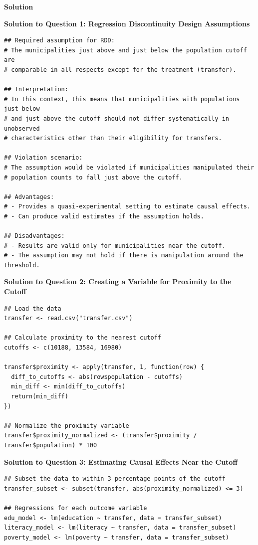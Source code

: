 \documentclass[12pt]{article}
\newif\ifsolutions
\begin{document}
\ifsolutions \color{blue}
{\color{blue}

\begin{center}
    \textbf{\large Solution}    
\end{center}

\textbf{Solution to Question 1: Regression Discontinuity Design Assumptions}
\begin{verbatim}
## Required assumption for RDD:
# The municipalities just above and just below the population cutoff are
# comparable in all respects except for the treatment (transfer).

## Interpretation:
# In this context, this means that municipalities with populations just below
# and just above the cutoff should not differ systematically in unobserved
# characteristics other than their eligibility for transfers.

## Violation scenario:
# The assumption would be violated if municipalities manipulated their
# population counts to fall just above the cutoff.

## Advantages:
# - Provides a quasi-experimental setting to estimate causal effects.
# - Can produce valid estimates if the assumption holds.

## Disadvantages:
# - Results are valid only for municipalities near the cutoff.
# - The assumption may not hold if there is manipulation around the threshold.
\end{verbatim}

\textbf{Solution to Question 2: Creating a Variable for Proximity to the Cutoff}
\begin{verbatim}
## Load the data
transfer <- read.csv("transfer.csv")

## Calculate proximity to the nearest cutoff
cutoffs <- c(10188, 13584, 16980)

transfer$proximity <- apply(transfer, 1, function(row) {
  diff_to_cutoffs <- abs(row$population - cutoffs)
  min_diff <- min(diff_to_cutoffs)
  return(min_diff)
})

## Normalize the proximity variable
transfer$proximity_normalized <- (transfer$proximity / transfer$population) * 100
\end{verbatim}

\textbf{Solution to Question 3: Estimating Causal Effects Near the Cutoff}
\begin{verbatim}
## Subset the data to within 3 percentage points of the cutoff
transfer_subset <- subset(transfer, abs(proximity_normalized) <= 3)

## Regressions for each outcome variable
edu_model <- lm(education ~ transfer, data = transfer_subset)
literacy_model <- lm(literacy ~ transfer, data = transfer_subset)
poverty_model <- lm(poverty ~ transfer, data = transfer_subset)


\end{verbatim}}
\end{document}
